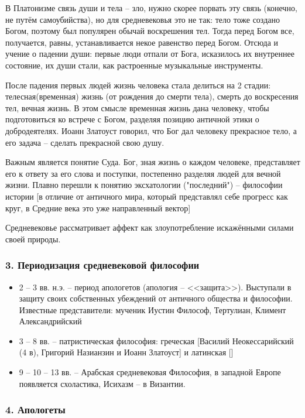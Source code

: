 \documentclass[a4paper, 12pt]{book} %
\begin{document}
В Платонизме связь души и тела -- зло, нужно скорее порвать эту связь (конечно, не путём самоубийства), но для средневековья это не так: тело тоже создано Богом, поэтому был популярен обычай воскрешения тел. Тогда перед Богом все, получается, равны, устанавливается некое равенство перед Богом. Отсюда и учение о падении души: первые люди отпали от Бога, исказилось их внутреннее состояние, их души стали, как растроенные музыкальные инструменты. 

После падения первых людей жизнь человека стала делиться на 2 стадии: телесная(временная) жизнь (от рождения до смерти тела), смерть до воскресения тел, вечная жизнь. В этом смысле временная жизнь дана человеку, чтобы подготовиться ко встрече с Богом,  разделяя позицию античной этики о добродеятелях. Иоанн Златоуст говорил, что Бог дал человеку прекрасное тело, а его задача -- сделать прекрасной свою душу.

Важным является понятие Суда. Бог, зная жизнь о каждом человеке, представляет его к ответу за его слова и поступки, постепенно разделяя людей для вечной жизни. Плавно перешли к понятию эксхатологии ("последний") -- философии истории [в отличие от античного мира, который представлял себе прогресс как круг, в Средние века это уже направленный вектор]

Средневековье рассматривает аффект как злоупотребление искажёнными силами своей природы.

\subsubsection*{3. Периодизация средневековой философии}

\begin{itemize}
\item 2 -- 3 вв. н.э. -- период апологетов (апология -- <<защита>>). Выступали в защиту своих собственных убеждений от античного общества и философии. Известные представители: мученик Иустин Философ, Тертулиан, Климент Александрийский
\item 3 -- 8 вв. -- патристическая философия: греческая [Василий Неокессарийский (4 в), Григорий Назианзин и Иоанн Златоуст] и латинская []
\item 9 -- 10 -- 13 вв. -- Арабская средневековая Философия, в западной Европе появляется схоластика, Исихазм -- в Византии.
\end{itemize}

\subsubsection*{4. Апологеты}
\end{document}
